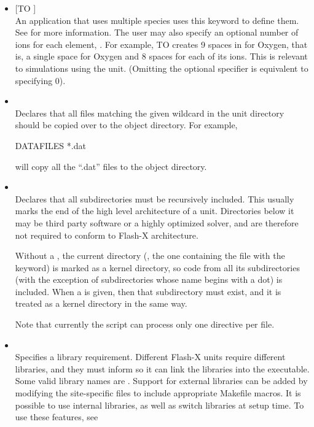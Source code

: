 \begin{itemize}
\item {}  [TO ] \\
An application that uses multiple species uses this keyword to define
them.  See  for more information.  The
user may also specify an optional number of ions for each element, 
.  For example,   TO
 creates 9 spaces in  for Oxygen, that is, a
single space for Oxygen and 8 spaces for each of its ions.  This is
relevant to simulations using the  unit.  (Omitting the
optional  specifier is equivalent to specifying  0).


\item {} \\
Declares that all files matching the given wildcard in the unit directory should
be copied over to the object directory. For example,
\begin{codeseg}
DATAFILES *.dat
\end{codeseg}
will copy all the ``.dat'' files to the object directory.



\item {} \metavar{[subdir]}\\
Declares that all subdirectories must be recursively included. This
usually marks the end of the high level architecture of a unit.
Directories below it may be third party software or a highly optimized
solver, and are therefore not required to conform to Flash-X architecture.

Without a , the current directory (\ie, the one containing
the  file with the  keyword) is marked as
a kernel directory, so code from all its subdirectories (with the exception
of subdirectories whose name begins with a dot) is included.
When a  is given, then that subdirectory must exist,
and it is treated as a kernel directory in the same way.

Note that currently the  script can process only one  directive
per  file.

\item {} \\
Specifies a library requirement.  Different Flash-X units require different
libraries, and they must inform  so it can link the libraries into the
executable.  Some valid library names are .  Support
for external libraries can be added by modifying the site-specific
 files to include appropriate Makefile macros. It is
possible to use internal libraries, as well as switch libraries at
setup time. To use these features, see \newline




\end{itemize}
